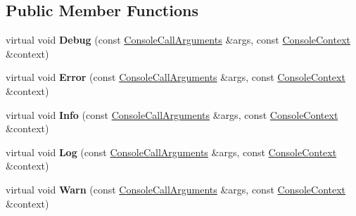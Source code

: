 \subsection*{Public Member Functions}
\begin{DoxyCompactItemize}
\item 
\mbox{\label{classv8_1_1debug_1_1ConsoleDelegate_a140a1186a2341fda7435db5ac5fbb8d6}} 
virtual void {\bfseries Debug} (const \mbox{\hyperlink{classv8_1_1debug_1_1ConsoleCallArguments}{Console\+Call\+Arguments}} \&args, const \mbox{\hyperlink{classv8_1_1debug_1_1ConsoleContext}{Console\+Context}} \&context)
\item 
\mbox{\label{classv8_1_1debug_1_1ConsoleDelegate_ae5ef7d80540ee3625b08ffbf5b28fb3e}} 
virtual void {\bfseries Error} (const \mbox{\hyperlink{classv8_1_1debug_1_1ConsoleCallArguments}{Console\+Call\+Arguments}} \&args, const \mbox{\hyperlink{classv8_1_1debug_1_1ConsoleContext}{Console\+Context}} \&context)
\item 
\mbox{\label{classv8_1_1debug_1_1ConsoleDelegate_a84a8e8e7b759a820dcdfaf4781660866}} 
virtual void {\bfseries Info} (const \mbox{\hyperlink{classv8_1_1debug_1_1ConsoleCallArguments}{Console\+Call\+Arguments}} \&args, const \mbox{\hyperlink{classv8_1_1debug_1_1ConsoleContext}{Console\+Context}} \&context)
\item 
\mbox{\label{classv8_1_1debug_1_1ConsoleDelegate_a22622e33ed554a8da35a795fed16fec0}} 
virtual void {\bfseries Log} (const \mbox{\hyperlink{classv8_1_1debug_1_1ConsoleCallArguments}{Console\+Call\+Arguments}} \&args, const \mbox{\hyperlink{classv8_1_1debug_1_1ConsoleContext}{Console\+Context}} \&context)
\item 
\mbox{\label{classv8_1_1debug_1_1ConsoleDelegate_a47b6b3b41f70354acacff6dbcf770368}} 
virtual void {\bfseries Warn} (const \mbox{\hyperlink{classv8_1_1debug_1_1ConsoleCallArguments}{Console\+Call\+Arguments}} \&args, const \mbox{\hyperlink{classv8_1_1debug_1_1ConsoleContext}{Console\+Context}} \&context)
\item 
\mbox{\label{classv8_1_1debug_1_1ConsoleDelegate_a291c6bce80e564969f6c0cfcc1ec6b0e}} 

\end{DoxyCompactItemize}
